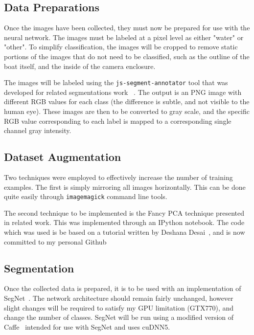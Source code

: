 \documentclass[10pt,twocolumn,letterpaper]{article}
\begin{document}
\subsection{Data Preparations}
Once the images have been collected, they must now be prepared for use with the neural network.
The images must be labeled at a pixel level as either "water" or "other". To simplify classification,
the images will be cropped to remove static portions of the images that do not need to be classified,
such as the outline of the boat itself, and the inside of the camera enclosure.

The images will be labeled using the \verb|js-segment-annotator| tool that was developed for related
segmentations work ~\cite{tangseng2017looking}. The output is an PNG image with different RGB values for each class (the difference is subtle, and not visible to the human eye). These images are then to be converted to gray scale, and the specific RGB value corresponding to each label is mapped to a corresponding single channel gray intensity.



\subsection{Dataset Augmentation}
Two techniques were employed to effectively increase the number of training examples. The first is simply mirroring all images horizontally. This can be done quite easily through \verb|imagemagick| command line tools.

The second technique to be implemented is the Fancy PCA technique presented in related work. This was implemented through an IPython notebook. The code which was used is be based on a tutorial written by Deshana Desai~\cite{FancyPCA}, and is now committed to my personal Github

\subsection{Segmentation}
Once the collected data is prepared, it is to be used with an implementation of SegNet~\cite{DBLP:journals/corr/BadrinarayananK15}. The network architecture should remain fairly unchanged, however slight changes will be required to satisfy my GPU limitation (GTX770), and change the number of classes. SegNet will be run using a modified version of Caffe~\cite{jia2014caffe} intended for use with SegNet and uses cuDNN5\cite{caffe-segnet-cudnn5}.
\end{document}
